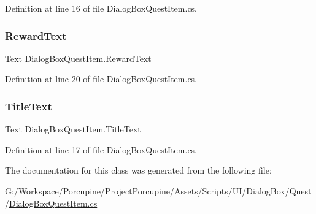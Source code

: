 Definition at line 16 of file Dialog\+Box\+Quest\+Item.\+cs.

\mbox{\label{class_dialog_box_quest_item_ace55d1de24051ef1e5212458b0019466}} 
\subsubsection{\texorpdfstring{Reward\+Text}{RewardText}}
{\footnotesize\ttfamily Text Dialog\+Box\+Quest\+Item.\+Reward\+Text}



Definition at line 20 of file Dialog\+Box\+Quest\+Item.\+cs.

\mbox{\label{class_dialog_box_quest_item_a58803a9f62c3b14a36d7bca70f77df28}} 
\subsubsection{\texorpdfstring{Title\+Text}{TitleText}}
{\footnotesize\ttfamily Text Dialog\+Box\+Quest\+Item.\+Title\+Text}



Definition at line 17 of file Dialog\+Box\+Quest\+Item.\+cs.



The documentation for this class was generated from the following file\+:\begin{DoxyCompactItemize}
\item 
G\+:/\+Workspace/\+Porcupine/\+Project\+Porcupine/\+Assets/\+Scripts/\+U\+I/\+Dialog\+Box/\+Quest/\hyperlink{_dialog_box_quest_item_8cs}{Dialog\+Box\+Quest\+Item.\+cs}\end{DoxyCompactItemize}
